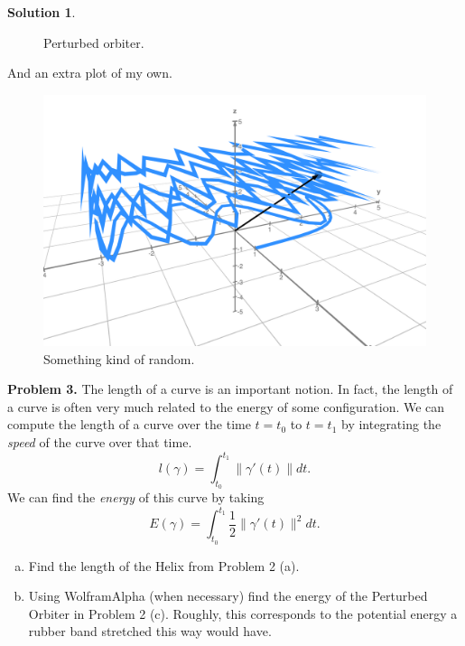 \documentclass[12pt]{report} %
\theoremstyle{definition}
\newtheorem{solution}{Solution}
\begin{document}
\begin{solution}
\begin{enumerate}[(a)]
\begin{figure}[H]
        \caption{Perturbed orbiter.}
    \end{figure}
\end{enumerate}
And an extra plot of my own.
\begin{figure}[H]
    \centering
    \includegraphics[width=.6\textwidth]{Images/random_curve.png}
    \caption{Something kind of random.}
\end{figure}
\end{solution}

\noindent\textbf{Problem 3.} The length of a curve is an important notion.  In fact, the length of a curve is often very much related to the energy of some configuration.  We can compute the length of a curve over the time $t=t_0$ to $t=t_1$ by integrating the \emph{speed} of the curve over that time. 
\[
l(\gamma)= \int_{t_0}^{t_1} \|\gamma'(t)\|dt.
\]
We can find the \emph{energy} of this curve by taking
\[
E(\gamma)= \int_{t_0}^{t_1} \frac{1}{2}\|\gamma'(t)\|^2dt.
\]
\begin{enumerate}[(a)]
    \item Find the length of the Helix from Problem 2 (a). 
    \item Using WolframAlpha (when necessary) find the energy of the Perturbed Orbiter in Problem 2 (c). Roughly, this corresponds to the potential energy a rubber band stretched this way would have. 
\end{enumerate}
\end{document}
